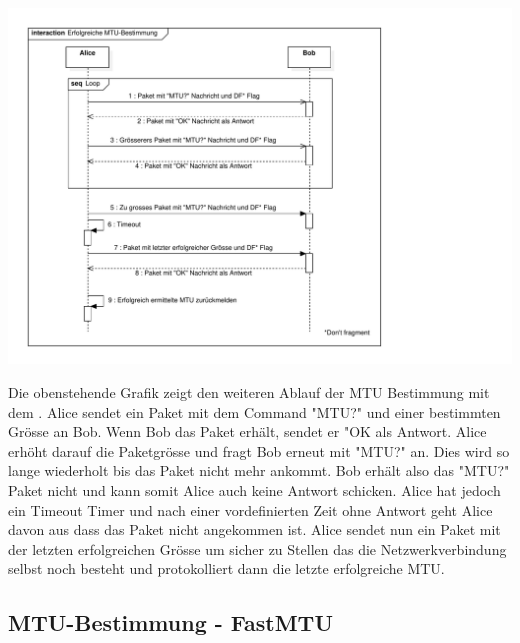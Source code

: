 \includegraphics[trim=10 10 200 10,clip,width=\textwidth]{mainpart/implementation/img/MTUBestimmungErfolgreich}

Die obenstehende Grafik zeigt den weiteren Ablauf der \acs{MTU} Bestimmung mit dem \tool. Alice sendet ein Paket mit dem Command "MTU?" und einer bestimmten Grösse an Bob. Wenn Bob das Paket erhält, sendet er "OK als Antwort. Alice erhöht darauf die Paketgrösse und fragt Bob erneut mit "MTU?" an. Dies wird so lange wiederholt bis das Paket nicht mehr ankommt. Bob erhält also das "MTU?" Paket nicht und kann somit Alice auch keine Antwort schicken. Alice hat jedoch ein Timeout Timer und nach einer vordefinierten Zeit ohne Antwort geht Alice davon aus dass das Paket nicht angekommen ist. Alice sendet nun ein Paket mit der letzten erfolgreichen Grösse um sicher zu Stellen das die Netzwerkverbindung selbst noch besteht und protokolliert dann die letzte erfolgreiche \acs{MTU}.

\subsection{MTU-Bestimmung - FastMTU}

